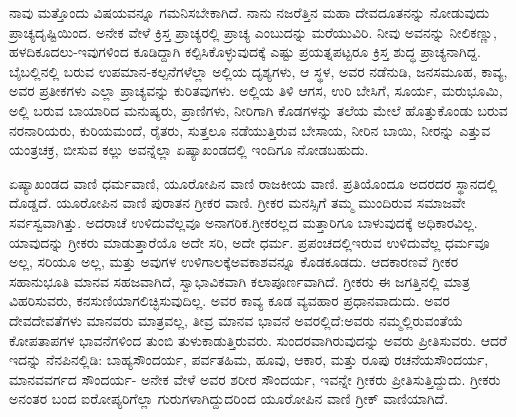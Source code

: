 ನಾವು ಮತ್ತೊಂದು ವಿಷಯವನ್ನೂ ಗಮನಿಸಬೇಕಾಗಿದೆ. ನಾನು ನಜರೆತ್ತಿನ ಮಹಾ ದೇವದೂತನನ್ನು ನೋಡುವುದು ಪ್ರಾಚ್ಯದೃಷ್ಟಿಯಿಂದ. ಅನೇಕ ವೇಳೆ ಕ್ರಿಸ್ತ ಪ್ರಾಚ್ಯರಲ್ಲಿ ಪ್ರಾಚ್ಯ ಎಂಬುದನ್ನು ಮರೆಯುವಿರಿ. ನೀವು ಅವನನ್ನು ನೀಲಿಕಣ್ಣು, ಹಳದಿಕೂದಲು-ಇವು\break ಗಳಿಂದ ಕೂಡಿದ್ದಾಗಿ ಕಲ್ಪಿಸಿಕೊಳ್ಳುವುದಕ್ಕೆ ಎಷ್ಟು ಪ್ರಯತ್ನಪಟ್ಟರೂ ಕ್ರಿಸ್ತ ಶುದ್ಧ ಪ್ರಾಚ್ಯನಾಗಿದ್ದ. ಬೈಬಲ್ಲಿನಲ್ಲಿ ಬರುವ ಉಪಮಾನ-ಕಲ್ಪನೆಗಳೆಲ್ಲಾ ಅಲ್ಲಿಯ ದೃಶ್ಯಗಳು, ಆ ಸ್ಥಳ, ಅವರ ನಡೆನುಡಿ, ಜನಸಮೂಹ, ಕಾವ್ಯ, ಅವರ ಪ್ರತೀಕಗಳು ಎಲ್ಲಾ ಪ್ರಾಚ್ಯವನ್ನು ಕುರಿತವು\-ಗಳು. ಅಲ್ಲಿಯ ತಿಳಿ ಆಗಸ, ಉರಿ ಬೇಸಿಗೆ, ಸೂರ್ಯ, ಮರುಭೂಮಿ, ಅಲ್ಲಿ ಬರುವ ಬಾಯಾರಿದ ಮನುಷ್ಯರು, ಪ್ರಾಣಿಗಳು, ನೀರಿಗಾಗಿ ಕೊಡಗಳನ್ನು ತಲೆಯ ಮೇಲೆ ಹೊತ್ತುಕೊಂಡು ಬರುವ ನರನಾರಿಯರು, ಕುರಿಯಮಂದೆ, ರೈತರು, ಸುತ್ತಲೂ ನಡೆಯುತ್ತಿರುವ ಬೇಸಾಯ, ನೀರಿನ ಬಾಯಿ, ನೀರನ್ನು ಎತ್ತುವ ಯಂತ್ರಚಕ್ರ, ಬೀಸುವ ಕಲ್ಲು ಅವನ್ನೆಲ್ಲಾ ಏಷ್ಯಾಖಂಡದಲ್ಲಿ ಇಂದಿಗೂ ನೋಡಬಹುದು.

ಏಷ್ಯಾಖಂಡದ ವಾಣಿ ಧರ್ಮವಾಣಿ, ಯೂರೋಪಿನ ವಾಣಿ ರಾಜಕೀಯ ವಾಣಿ. ಪ್ರತಿಯೊಂದೂ ಅದರದರ ಸ್ಥಾನದಲ್ಲಿ ದೊಡ್ಡದೆ. ಯೂರೋಪಿನ ವಾಣಿ ಪುರಾತನ ಗ್ರೀಕರ ವಾಣಿ. ಗ್ರೀಕರ ಮನಸ್ಸಿಗೆ ತಮ್ಮ ಮುಂದಿರುವ ಸಮಾಜವೇ ಸರ್ವಸ್ವವಾಗಿತ್ತು. ಅದರಾಚೆ ಉಳಿದುವೆಲ್ಲವೂ ಅನಾಗರಿಕ.ಗ್ರೀಕರಲ್ಲದ ಮತ್ತಾರಿಗೂ ಬಾಳುವುದಕ್ಕೆ ಅಧಿಕಾರವಿಲ್ಲ. ಯಾವುದನ್ನು ಗ್ರೀಕರು ಮಾಡುತ್ತಾರೆಯೊ ಅದೇ ಸರಿ, ಅದೇ ಧರ್ಮ. ಪ್ರಪಂಚದಲ್ಲಿ\break ಇರುವ ಉಳಿದುವೆಲ್ಲ ಧರ್ಮವೂ ಅಲ್ಲ, ಸರಿಯೂ ಅಲ್ಲ, ಮತ್ತು ಅವುಗಳ ಉಳಿಗಾಲಕ್ಕೆ\break ಅವಕಾಶವನ್ನೂ ಕೊಡಕೂಡದು. ಆದಕಾರಣವೆ ಗ್ರೀಕರ ಸಹಾನುಭೂತಿ ಮಾನವ ಸಹಜ\-ವಾಗಿದೆ, ಸ್ವಾಭಾವಿಕವಾಗಿ ಕಲಾಪೂರ್ಣವಾಗಿದೆ. ಗ್ರೀಕರು ಈ ಜಗತ್ತಿನಲ್ಲಿ ಮಾತ್ರ ವಿಹರಿಸುವರು, ಕನಸುಣಿಯಾಗಲಿಚ್ಛಿಸುವುದಿಲ್ಲ. ಅವರ ಕಾವ್ಯ ಕೂಡ ವ್ಯವಹಾರ ಪ್ರಧಾನವಾದುದು. ಅವರ ದೇವದೇವತೆಗಳು ಮಾನವರು ಮಾತ್ರವಲ್ಲ, ತೀವ್ರ ಮಾನವ ಭಾವನೆ ಅವರಲ್ಲಿದೆ:\break ಅವರು ನಮ್ಮಲ್ಲಿರುವಂತೆಯೆ ಕೋಪತಾಪಗಳ ಭಾವನೆಗಳಿಂದ ತುಂಬಿ ತುಳುಕಾಡುತ್ತಿರುವರು. ಸುಂದರವಾಗಿರುವುದನ್ನು ಅವರು ಪ್ರೀತಿಸುವರು. ಆದರೆ ಇದನ್ನು ನೆನಪಿನಲ್ಲಿಡಿ: ಬಾಹ್ಯಸೌಂದರ್ಯ, ಪರ್ವತಹಿಮ, ಹೂವು, ಆಕಾರ, ಮತ್ತು ರೂಪು ರಚನೆಯ\break ಸೌಂದರ್ಯ, ಮಾನವವರ್ಗದ ಸೌಂದರ್ಯ- ಅನೇಕ ವೇಳೆ ಅವರ ಶರೀರ ಸೌಂದರ್ಯ, ಇವನ್ನೇ ಗ್ರೀಕರು ಪ್ರೀತಿಸುತ್ತಿದ್ದುದು. ಗ್ರೀಕರು ಅನಂತರ ಬಂದ ಐರೋಪ್ಯರಿಗೆಲ್ಲಾ ಗುರುಗಳಾಗಿದ್ದುದರಿಂದ ಯೂರೋಪಿನ ವಾಣಿ ಗ್ರೀಕ್​ ವಾಣಿಯಾಗಿದೆ.

